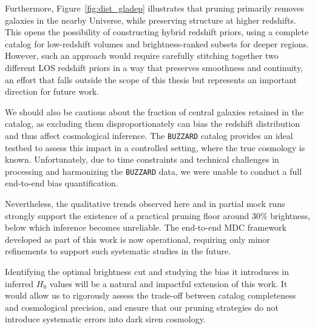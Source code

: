 Furthermore, Figure~\ref{fig:dist_gladep} illustrates that pruning primarily removes galaxies in the nearby Universe, while preserving structure at higher redshifts. This opens the possibility of constructing hybrid redshift priors, using a complete catalog for low-redshift volumes and brightness-ranked subsets for deeper regions. However, such an approach would require carefully stitching together two different \ac{LOS} redshift priors in a way that preserves smoothness and continuity, an effort that falls outside the scope of this thesis but represents an important direction for future work.

We should also be cautious about the fraction of central galaxies retained in the catalog, as excluding them disproportionately can bias the redshift distribution and thus affect cosmological inference. The \texttt{BUZZARD} catalog provides an ideal testbed to assess this impact in a controlled setting, where the true cosmology is known. Unfortunately, due to time constraints and technical challenges in processing and harmonizing the \texttt{BUZZARD} data, we were unable to conduct a full end-to-end bias quantification.

Nevertheless, the qualitative trends observed here and in partial mock runs strongly support the existence of a practical pruning floor around 30\% brightness, below which inference becomes unreliable. The end-to-end \ac{MDC} framework developed as part of this work is now operational, requiring only minor refinements to support such systematic studies in the future.

Identifying the optimal brightness cut and studying the bias it introduces in inferred $H_0$ values will be a natural and impactful extension of this work. It would allow us to rigorously assess the trade-off between catalog completeness and cosmological precision, and ensure that our pruning strategies do not introduce systematic errors into dark siren cosmology.
